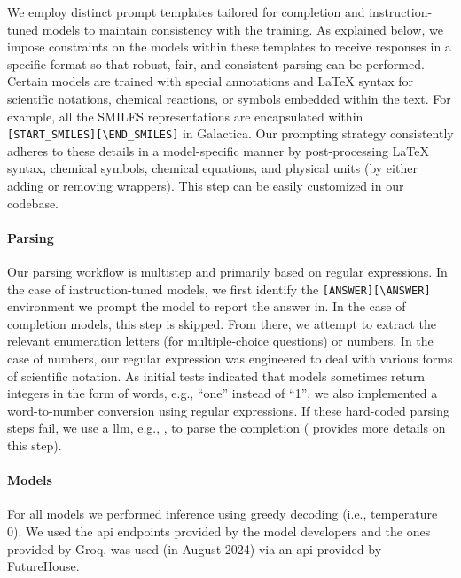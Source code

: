\documentclass[11pt, oneside]{article}
\begin{document}
\begin{refsection}
We employ distinct prompt templates tailored for completion and instruction-tuned models to maintain consistency with the training.
As explained below, we impose constraints on the models within these templates to receive responses in a specific format so that robust, fair, and consistent parsing can be performed.
Certain models are trained with special annotations and \LaTeX\xspace syntax for scientific notations, chemical reactions, or symbols embedded within the text.
For example, all the SMILES representations are encapsulated within \texttt{[START\_SMILES][\textbackslash END\_SMILES]} in Galactica\autocite{taylor2022galactica}.
Our prompting strategy consistently adheres to these details in a model-specific manner by post-processing \LaTeX\xspace syntax, chemical symbols, chemical equations, and physical units (by either adding or removing wrappers).
This step can be easily customized in our codebase.



\paragraph{Parsing}
Our parsing workflow is multistep and primarily based on regular expressions.
In the case of instruction-tuned models, we first identify the \texttt{[ANSWER]}\texttt{[\textbackslash ANSWER]} environment we prompt the model to report the answer in.
In the case of completion models, this step is skipped. From there, we attempt to extract the relevant enumeration letters (for multiple-choice questions) or numbers.
In the case of numbers, our regular expression was engineered to deal with various forms of scientific notation.
As initial tests indicated that models sometimes return integers in the form of words, e.g., \enquote{one} instead of \enquote{1}, we also implemented a word-to-number conversion using regular expressions.
If these hard-coded parsing steps fail, we use a \gls{llm}, e.g., \ClaudeThreeFiveSonnet, to parse the completion ( provides more details on this step).


\paragraph{Models}
For all models we performed inference using greedy decoding (i.e., temperature 0). We used the \gls{api} endpoints provided by the model developers and the ones provided by Groq. \PaperQATwo was used (in August 2024) via an \gls{api} provided by FutureHouse.


\end{refsection}
\end{document}
